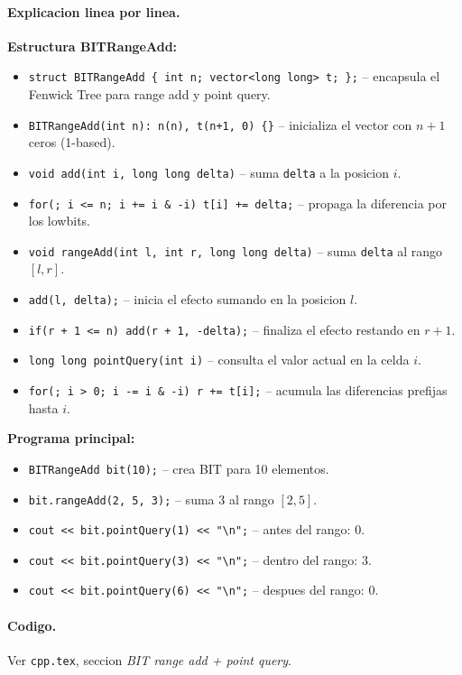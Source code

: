 \paragraph{Explicacion linea por linea.}
\textbf{Estructura BITRangeAdd:}
\begin{itemize}\setlength\itemsep{0pt}
	\item \verb|struct BITRangeAdd { int n; vector<long long> t; };| -- encapsula el Fenwick Tree para range add y point query.
	\item \verb|BITRangeAdd(int n): n(n), t(n+1, 0) {}| -- inicializa el vector con $n+1$ ceros (1-based).
	\item \verb|void add(int i, long long delta)| -- suma \texttt{delta} a la posicion $i$.
	\item \verb|for(; i <= n; i += i & -i) t[i] += delta;| -- propaga la diferencia por los lowbits.
	\item \verb|void rangeAdd(int l, int r, long long delta)| -- suma \texttt{delta} al rango $[l, r]$.
	\item \verb|add(l, delta);| -- inicia el efecto sumando en la posicion $l$.
	\item \verb|if(r + 1 <= n) add(r + 1, -delta);| -- finaliza el efecto restando en $r + 1$.
	\item \verb|long long pointQuery(int i)| -- consulta el valor actual en la celda $i$.
	\item \verb|for(; i > 0; i -= i & -i) r += t[i];| -- acumula las diferencias prefijas hasta $i$.
\end{itemize}
\textbf{Programa principal:}
\begin{itemize}\setlength\itemsep{0pt}
	\item \verb|BITRangeAdd bit(10);| -- crea BIT para 10 elementos.
	\item \verb|bit.rangeAdd(2, 5, 3);| -- suma 3 al rango $[2, 5]$.
	\item \verb|cout << bit.pointQuery(1) << "\n";| -- antes del rango: 0.
	\item \verb|cout << bit.pointQuery(3) << "\n";| -- dentro del rango: 3.
	\item \verb|cout << bit.pointQuery(6) << "\n";| -- despues del rango: 0.
\end{itemize}

\paragraph{Codigo.}
Ver \texttt{cpp.tex}, seccion \textit{BIT range add + point query}.

\vspace{0.5em}

